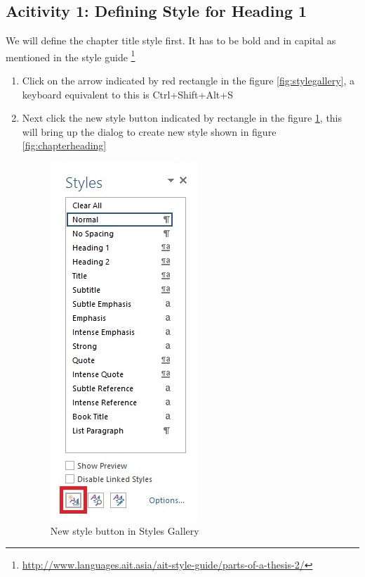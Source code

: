 \subsection{Acitivity 1: Defining Style for Heading 1}
We will define the chapter title style first. It has to be bold and in capital as mentioned in the style guide \footnote{\url{http://www.languages.ait.asia/ait-style-guide/parts-of-a-thesis-2/}} 
\begin{enumerate}
    \item Click on the arrow indicated by red rectangle in the figure   \ref{fig:stylegallery}, a keyboard equivalent to this is Ctrl+Shift+Alt+S
    \item Next click the new style button indicated by rectangle in the figure \ref{fig:styletaskpane}, this will bring up the dialog to create new style shown in figure \ref{fig:chapterheading}
    \begin{figure}
        \centering
        \includegraphics[scale=0.6 ]{./Figures/styletaskpane.jpg}
        \caption{New style button in Styles Gallery }
        \label{fig:styletaskpane}
    \end{figure}
    

\end{enumerate}
